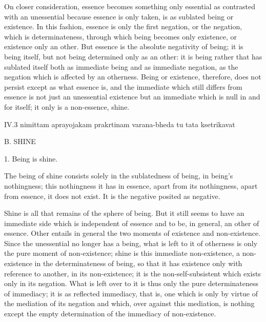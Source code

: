 On closer consideration, essence becomes something
only essential as contrasted with an unessential
because essence is only taken,
is as sublated being or existence.
In this fashion, essence is only the first negation,
or the negation, which is determinateness,
through which being becomes only existence,
or existence only an other.
But essence is the absolute negativity of being;
it is being itself, but not being determined only as an other:
it is being rather that has sublated itself
both as immediate being
and as immediate negation,
as the negation which is affected by an otherness.
Being or existence, therefore, does not persist
except as what essence is,
and the immediate which still differs from essence is not just
an unessential existence but an immediate
which is null in and for itself;
it only is a non-essence, shine.

IV.3
nimittam aprayojakam prakrtinam varana-bheda tu tata ksetrikavat

B. SHINE

1. Being is shine.

The being of shine consists solely
in the sublatedness of being,
in being's nothingness;
this nothingness it has in essence,
apart from its nothingness,
apart from essence, it does not exist.
It is the negative posited as negative.

Shine is all that remains of the sphere of being.
But it still seems to have an immediate side
which is independent of essence
and to be, in general, an other of essence.
Other entails in general the two moments
of existence and non-existence.
Since the unessential no longer has a being,
what is left to it of otherness is
only the pure moment of non-existence;
shine is this immediate non-existence,
a non-existence in the determinateness of being,
so that it has existence only with reference to another,
in its non-existence;
it is the non-self-subsistent
which exists only in its negation.
What is left over to it is thus only
the pure determinateness of immediacy;
it is as reflected immediacy, that is,
one which is only by virtue of
the mediation of its negation
and which, over against this mediation, is
nothing except the empty determination
of the immediacy of non-existence.

